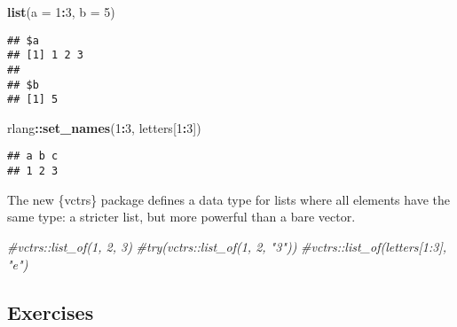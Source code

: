 \documentclass[]{book}
\newenvironment{Shaded}{\begin{snugshade}}{\end{snugshade}}
\newcommand{\CommentTok}[1]{\textcolor[rgb]{0.56,0.35,0.01}{\textit{#1}}}
\newcommand{\DataTypeTok}[1]{\textcolor[rgb]{0.13,0.29,0.53}{#1}}
\newcommand{\DecValTok}[1]{\textcolor[rgb]{0.00,0.00,0.81}{#1}}
\newcommand{\KeywordTok}[1]{\textcolor[rgb]{0.13,0.29,0.53}{\textbf{#1}}}
\newcommand{\NormalTok}[1]{#1}
\newcommand{\OperatorTok}[1]{\textcolor[rgb]{0.81,0.36,0.00}{\textbf{#1}}}
\begin{document}
\begin{Shaded}
\begin{Highlighting}[]
\KeywordTok{list}\NormalTok{(}\DataTypeTok{a =} \DecValTok{1}\OperatorTok{:}\DecValTok{3}\NormalTok{, }\DataTypeTok{b =} \DecValTok{5}\NormalTok{)}
\end{Highlighting}
\end{Shaded}

\begin{verbatim}
## $a
## [1] 1 2 3
## 
## $b
## [1] 5
\end{verbatim}

\begin{Shaded}
\begin{Highlighting}[]
\NormalTok{rlang}\OperatorTok{::}\KeywordTok{set_names}\NormalTok{(}\DecValTok{1}\OperatorTok{:}\DecValTok{3}\NormalTok{, letters[}\DecValTok{1}\OperatorTok{:}\DecValTok{3}\NormalTok{])}
\end{Highlighting}
\end{Shaded}

\begin{verbatim}
## a b c 
## 1 2 3
\end{verbatim}

The new \{vctrs\} package defines a data type for lists where all elements have the same type: a stricter list, but more powerful than a bare vector.

\begin{Shaded}
\begin{Highlighting}[]
\CommentTok{#vctrs::list_of(1, 2, 3)}
\CommentTok{#try(vctrs::list_of(1, 2, "3"))}
\CommentTok{#vctrs::list_of(letters[1:3], "e")}
\end{Highlighting}
\end{Shaded}

\hypertarget{exercises-9}{%
\subsection{Exercises}\label{exercises-9}}
\end{document}

